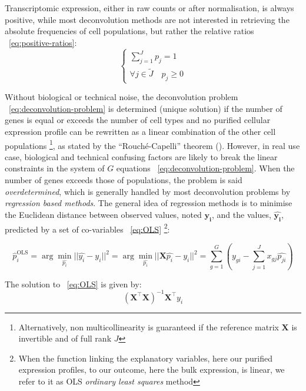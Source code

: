 \documentclass[long, final]{jobim}
\begin{document}
Transcriptomic expression, either in raw counts or after normalisation, is always positive, while most deconvolution methods are not interested in retrieving the absolute frequencies of cell populations, but rather the relative ratios \equationname ~\ref{eq:positive-ratios}:
\begin{equation}
\label{eq:positive-ratios}
\begin{cases}
\sum_{j=1}^J p_{j}=1\\
\forall j \in \widetilde{J} \quad p_j\ge 0
\end{cases}
\end{equation}

Without biological or technical noise, the deconvolution problem \equationname ~\ref{eq:deconvolution-problem} is determined (unique solution) if the number of genes is equal or exceeds the number of cell types and no purified cellular expression profile can be rewritten as a linear combination of the other cell populations \footnote{Alternatively, non multicollinearity is guaranteed if the reference matrix \(\boldsymbol{X}\) is invertible and of full rank \(J\)}, as stated by the \enquote{Rouché-Capelli} theorem (\cite{abbas_etal09}). However, in real use case, biological and technical confusing factors are likely to break the linear constraints in the system of $G$ equations \equationname ~\ref{eq:deconvolution-problem}. When the number of genes exceeds those of populations, the problem is said \textit{overdetermined}, which is generally handled by most deconvolution problems by \textit{regression based methods}. The general idea of regression methods is to minimise the Euclidean distance between observed values, noted \(\boldsymbol{y_i}\), and the values, \(\boldsymbol{\hat{y_i}}\), predicted by a set of co-variables \equationname ~\ref{eq:OLS} \footnote{When the function linking the explanatory variables, here our purified expression profiles, to our outcome, here the bulk expression, is linear, we refer to it as OLS \textit{ordinary least squares} method}:

\begin{equation}
 \label{eq:OLS}
 \hat{p}_{i}^{\text{OLS}} = \arg \min_{\hat{p_i}} ||\hat{y_i} - y_i||^2 = \arg \min_{\hat{p_i}}  ||\boldsymbol{X}\hat{p_i} - y_i||^2 = \sum_{g=1}^G \left( y_{gi} - \sum_{j=1}^J  x_{gj} \hat{p_{ji}}\right)  
\end{equation}

The solution to \equationname ~\ref{eq:OLS} is given by:
\begin{equation}
    \label{eq:OLS-estimate}
    (\boldsymbol{X}^\top\boldsymbol{X})^{-1}\boldsymbol{X}^\top y_i
\end{equation}
\end{document}
